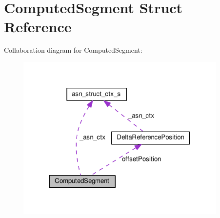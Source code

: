 \hypertarget{structComputedSegment}{}\section{Computed\+Segment Struct Reference}
\label{structComputedSegment}


Collaboration diagram for Computed\+Segment\+:\nopagebreak
\begin{figure}[H]
\begin{center}
\leavevmode
\includegraphics[width=296pt]{structComputedSegment__coll__graph}
\end{center}
\end{figure}
